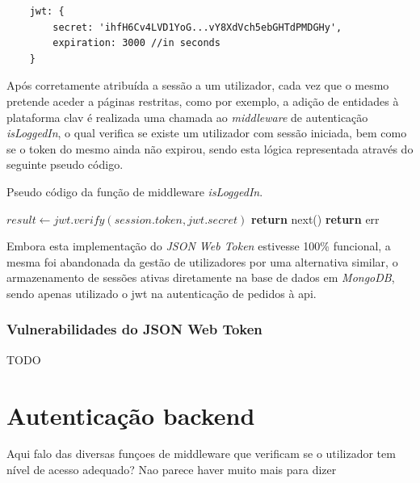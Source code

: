 \begin{verbatim}
    jwt: {
        secret: 'ihfH6Cv4LVD1YoG...vY8XdVch5ebGHTdPMDGHy',
        expiration: 3000 //in seconds
    }
\end{verbatim}

Após corretamente atribuída a sessão a um utilizador, cada vez que o mesmo pretende aceder a páginas restritas, como por exemplo, a adição de entidades à plataforma \gls{clav} é realizada uma chamada ao \emph{middleware} de autenticação \emph{isLoggedIn}, o qual verifica se existe um utilizador com sessão iniciada, bem como se o token do mesmo ainda não expirou, sendo esta lógica representada através do seguinte pseudo código.

\begin{algorithm}
    \caption{Pseudo código da função  de middleware \emph{isLoggedIn}.}
    \begin{algorithmic}[1]
        \State $result \gets jwt.verify(session.token, jwt.secret)$
                \State \textbf{return} next()
            \Else
                \State \textbf{return} err
            \EndIf
        \EndIf
    \EndFunction
    \end{algorithmic}
\end{algorithm}

Embora esta implementação do \emph{JSON Web Token} estivesse 100\% funcional, a mesma foi abandonada da gestão de utilizadores por uma alternativa similar, o armazenamento de sessões ativas diretamente na base de dados em \emph{MongoDB}, sendo apenas utilizado o \gls{jwt} na autenticação de pedidos à \gls{api}.

\cleardoublepage
\subsubsection{Vulnerabilidades do JSON Web Token}

TODO

\cleardoublepage
\section{Autenticação backend}

Aqui falo das diversas funçoes de middleware que verificam se o utilizador tem nível de acesso adequado? Nao parece haver muito mais para dizer
